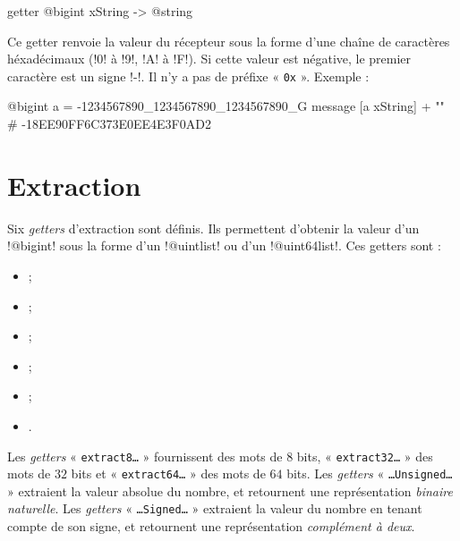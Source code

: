 
\begin{galgasbox}
getter @bigint xString -> @string
\end{galgasbox}

Ce getter renvoie la valeur du récepteur sous la forme d'une chaîne de caractères héxadécimaux (\ggs!0! à \ggs!9!, \ggs!A! à \ggs!F!). Si cette valeur est négative, le premier caractère est un signe \ggs!-!. Il n'y a pas de préfixe « \texttt{0x} ». Exemple :

\begin{galgas}
@bigint a = -1234567890_1234567890_1234567890_G
message [a xString] + "\n" # -18EE90FF6C373E0EE4E3F0AD2
\end{galgas}









\section{Extraction}

Six \emph{getters} d'extraction sont définis. Ils permettent d'obtenir la valeur d'un \ggs!@bigint! sous la forme d'un \ggs!@uintlist! ou d'un \ggs!@uint64list!. Ces getters sont :
\begin{itemize}
  \item {} ;
  \item {} ;
  \item {} ;
  \item {} ;
  \item {} ;
  \item {}.
\end{itemize}

Les \emph{getters} « \texttt{extract8…} » fournissent des mots de $8$ bits, « \texttt{extract32…} »  des mots de $32$ bits et « \texttt{extract64…} »  des mots de $64$ bits. Les \emph{getters} « \texttt{…Unsigned…} » extraient la valeur absolue du nombre, et retournent une représentation \emph{binaire naturelle}. Les \emph{getters} « \texttt{…Signed…} » extraient la valeur du nombre en tenant compte de son signe, et retournent une représentation \emph{complément à deux}.

